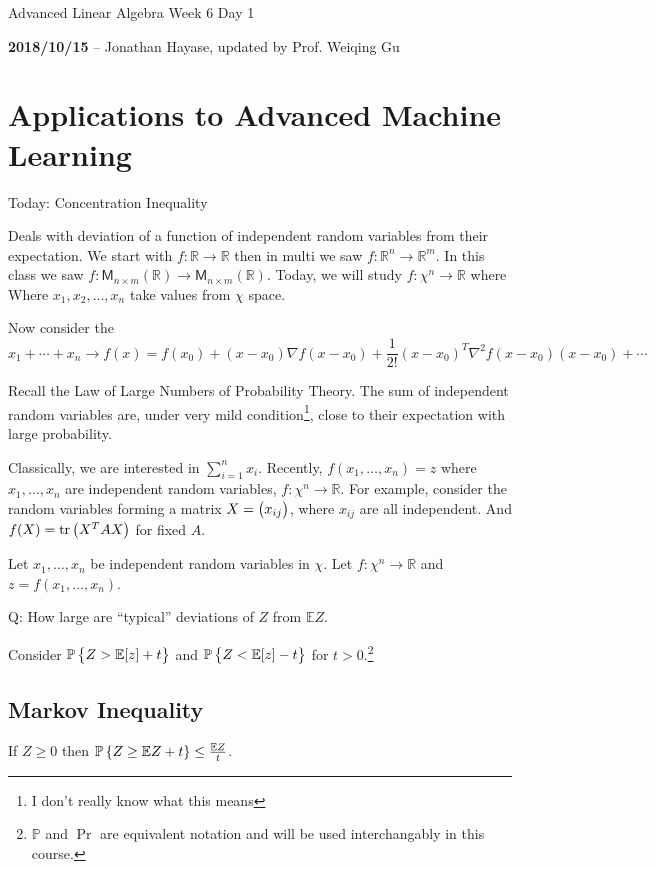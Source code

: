 \documentclass{article}
\DeclareMathOperator{\trace}{tr}
\newcommand{\RR}{\mathbb{R}}
\begin{document}
\begin{center}
  \Large Advanced Linear Algebra Week 6 Day 1
  \normalsize

  \textbf{2018/10/15} -- Jonathan Hayase, updated by Prof. Weiqing Gu
\end{center}

\section{Applications to Advanced Machine Learning}

Today: Concentration Inequality

Deals with deviation of a function of independent random variables from their expectation.
We start with \(f : \RR \to \RR\) then in multi we saw \(f : \RR^n \to \RR^m\).
In this class we saw \(f:\mathsf{M}_{n\times m}(\RR) \to \mathsf{M}_{n\times m}(\RR)\).
Today, we will study \(f: \chi^n \to \RR\) where
Where \(x_1, x_2, \dots, x_n\) take values from \(\chi\) space.

Now consider the
\[x_1 + \cdots + x_n \to f(x) = f(x_0) + (x - x_0)\nabla f(x - x_0) + \frac{1}{2!} (x-x_0)^T\nabla^2f(x-x_0) (x-x_0) + \cdots\]

Recall the Law of Large Numbers of Probability Theory.
The sum of independent random variables are, under very mild condition\footnote{I don't really know what this means}, close to their expectation with large probability.

Classically, we are interested in \(\sum_{i = 1}^n x_i\).
Recently, \(f(x_1, \dots, x_n) = z\) where \(x_1, \dots, x_n\) are independent random variables, \(f: \chi^n \to \RR\).
For example, consider the random variables forming a matrix \(X = \del{x_{ij}}\), where \(x_{ij}\) are all independent.
And \(f(X) = \trace\del{X^TAX}\) for fixed \(A\).

Let \(x_1, \dots, x_n\) be independent random variables in \(\chi\).
Let \(f : \chi^n \to \RR\) and \(z = f(x_1, \dots, x_n)\).

Q: How large are ``typical'' deviations of \(Z\) from \(\mathbb{E}Z\).

Consider \(\mathbb{P}\set{Z >  \mathbb{E}[z]+ t }\) and \(\mathbb{P}\set{Z < \mathbb{E}[z] - t}\) for \(t > 0\).\footnote{\(\mathbb P\) and \(\mathop{\mathrm{Pr}}\) are equivalent notation and will be used interchangably in this course.}

\subsection{Markov Inequality}
If \(Z \geq 0\) then \(\mathbb P \set{Z \geq \mathbb EZ + t} \leq \frac{\mathbb EZ}{t}\).
\end{document}
